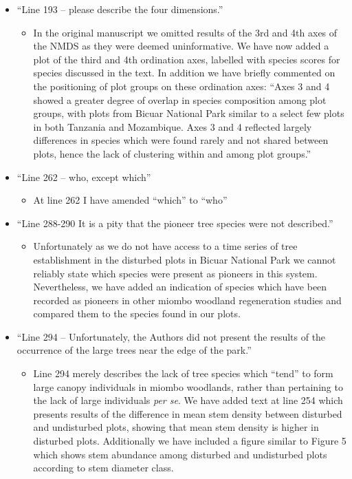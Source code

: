 \documentclass[a4paper]{letter}
\begin{document}
\begin{letter}{}
\begin{itemize}
\begin{itemize}
		\end{itemize}
	\item{``Line 193 – please describe the four dimensions.''}
		\begin{itemize}
			\item{In the original manuscript we omitted results of the 3rd and 4th axes of the NMDS as they were deemed uninformative. We have now added a plot of the third and 4th ordination axes, labelled with species scores for species discussed in the text. In addition we have briefly commented on the positioning of plot groups on these ordination axes: ``Axes 3 and 4 showed a greater degree of overlap in species composition among plot groups, with plots from Bicuar National Park similar to a select few plots in both Tanzania and Mozambique. Axes 3 and 4 reflected largely differences in species which were found rarely and not shared between plots, hence the lack of clustering within and among plot groups.''}
		\end{itemize}
	\item{``Line 262 – who, except which''}
		\begin{itemize}
			\item{At line 262 I have amended ``which'' to ``who''}
		\end{itemize}
	\item{``Line 288-290 It is a pity that the pioneer tree species were not described.''}
		\begin{itemize}
			\item{Unfortunately as we do not have access to a time series of tree establishment in the disturbed plots in Bicuar National Park we cannot reliably state which species were present as pioneers in this system. Nevertheless, we have added an indication of species which have been recorded as pioneers in other miombo woodland regeneration studies and compared them to the species found in our plots.}
		\end{itemize}
	\item{``Line 294 – Unfortunately, the Authors did not present the results of the occurrence of the large trees near the edge of the park.''}
		\begin{itemize}
			\item{Line 294 merely describes the lack of tree species which ``tend'' to form large canopy individuals in miombo woodlands, rather than pertaining to the lack of large individuals \textit{per se}. We have added text at line 254 which presents results of the difference in mean stem density between disturbed and undisturbed plots, showing that mean stem density is higher in disturbed plots. Additionally we have included a figure similar to Figure 5 which shows stem abundance among disturbed and undisturbed plots according to stem diameter class.}

\end{itemize}
\end{itemize}
\end{letter}
\end{document}
